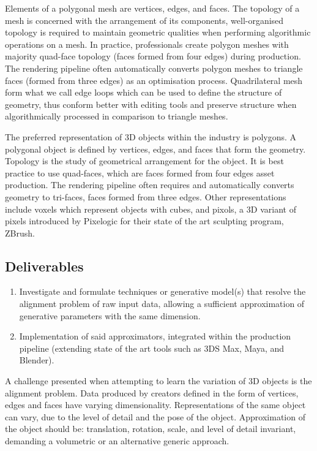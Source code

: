\documentclass[a4paper, fontsize=15pt, onecolumn]{article} %
\numberwithin{equation}{section} %
\numberwithin{figure}{section} %
\numberwithin{table}{section} %
\begin{document}
Elements of a polygonal mesh are vertices, edges, and faces. The topology of a mesh is concerned with the arrangement of its components, well-organised topology is required to maintain geometric qualities
when performing algorithmic operations on a mesh. In practice, professionals create polygon meshes with majority quad-face topology (faces formed from four edges) during production. The rendering pipeline often automatically converts polygon meshes to triangle faces (formed from three edges) as an optimisation process. Quadrilateral mesh form what we call edge loops which can be used to define the structure of geometry, thus conform better with editing tools and preserve structure when algorithmically processed in comparison to triangle meshes.

The preferred representation of 3D objects within the industry is polygons. A polygonal object is defined by vertices, edges, and faces that form the geometry. Topology is the study of geometrical arrangement for the object. It is best practice to use quad-faces, which are faces formed from four edges asset production. The rendering pipeline often requires and automatically converts geometry to tri-faces, faces formed from three edges. Other representations include voxels which represent objects with cubes, and pixols, a 3D variant of pixels introduced by Pixelogic for their state of the art sculpting program, ZBrush.


\subsection{Deliverables}
\begin{enumerate}
	\item Investigate and formulate techniques or generative model(s) that resolve the alignment problem of raw input data, allowing a sufficient approximation of generative parameters with the same dimension.
	\item Implementation of said approximators, integrated within the production pipeline (extending state of the art tools such as 3DS Max, Maya, and Blender).
\end{enumerate}

A challenge presented when attempting to learn the variation of 3D objects is the alignment problem. Data produced by creators defined in the form of vertices, edges and faces have varying dimensionality. Representations of the same object can vary, due to the level of detail and the pose of the object. Approximation of the object should be: translation, rotation, scale, and level of detail invariant, demanding a volumetric or an alternative generic approach.
\end{document}
